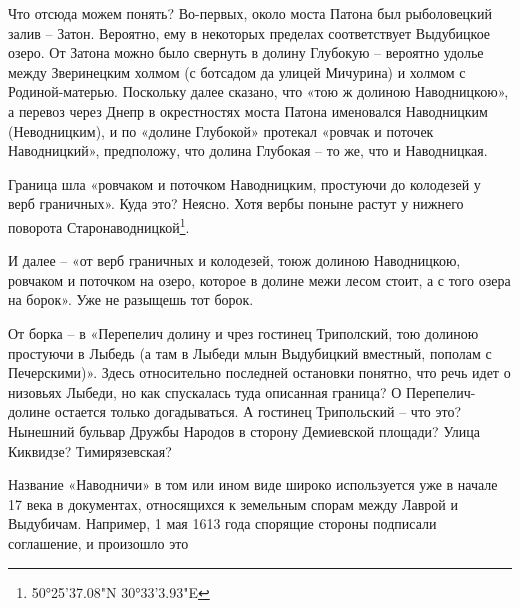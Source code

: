 Что отсюда можем понять? Во-первых, около моста Патона был рыболовецкий залив – Затон. Вероятно, ему в некоторых пределах соответствует Выдубицкое озеро. От Затона можно было свернуть в долину Глубокую – вероятно удолье между Зверинецким холмом (с ботсадом да улицей Мичурина) и холмом с Родиной-матерью. Поскольку далее сказано, что «тою ж долиною Наводницкою», а перевоз через Днепр в окрестностях моста Патона именовался Наводницким (Неводницким), и по «долине Глубокой» протекал «ровчак и поточек Наводницкий», предположу, что долина Глубокая – то же, что и Наводницкая.

Граница шла «ровчаком и поточком Наводницким, простуючи до колодезей у верб граничных». Куда это? Неясно. Хотя вербы поныне растут у нижнего поворота Старонаводницкой\footnote{50°25'37.08"N 30°33'3.93"E}.

И далее – «от верб граничных и колодезей, тоюж долиною Наводницкою, ровчаком и поточком на озеро, которое в долине межи лесом стоит, а с того озера на борок». Уже не разыщешь тот борок.



От борка – в «Перепелич долину и чрез гостинец Триполский, тою долиною простуючи в Лыбедь (а там в Лыбеди млын Выдубицкий вместный, пополам с Печерскими)». Здесь относительно последней остановки понятно, что речь идет о низовьях Лыбеди, но как спускалась туда описанная граница? О Перепелич-долине остается только догадываться. А гостинец Трипольский – что это? Нынешний бульвар Дружбы Народов в сторону Демиевской площади? Улица Киквидзе? Тимирязевская?

Название «Наводничи» в том или ином виде широко используется уже в начале 17 века в документах, относящихся к земельным спорам между Лаврой и Выдубичам. Например, 1 мая 1613 года спорящие стороны подписали соглашение, и произошло это

